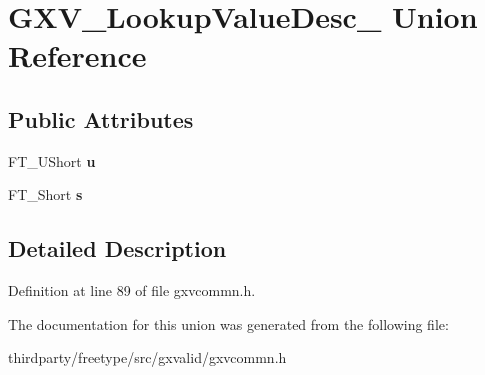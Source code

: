 \hypertarget{union_g_x_v___lookup_value_desc__}{}\section{G\+X\+V\+\_\+\+Lookup\+Value\+Desc\+\_\+ Union Reference}
\label{union_g_x_v___lookup_value_desc__}
\subsection*{Public Attributes}
\begin{DoxyCompactItemize}
\item 
\mbox{\label{union_g_x_v___lookup_value_desc___a3aff40b35a59c19716eb99afbac1b7ef}} 
F\+T\+\_\+\+U\+Short {\bfseries u}
\item 
\mbox{\label{union_g_x_v___lookup_value_desc___a46488bb616e648a1fe4c99850948a409}} 
F\+T\+\_\+\+Short {\bfseries s}
\end{DoxyCompactItemize}


\subsection{Detailed Description}


Definition at line 89 of file gxvcommn.\+h.



The documentation for this union was generated from the following file\+:\begin{DoxyCompactItemize}
\item 
thirdparty/freetype/src/gxvalid/gxvcommn.\+h\end{DoxyCompactItemize}
